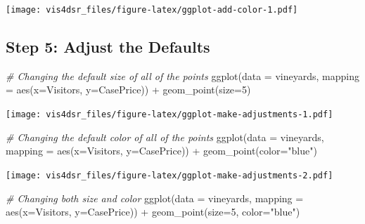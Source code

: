 \documentclass[
]{krantz}
\makeatletter
\newenvironment{Shaded}{\begin{snugshade}}{\end{snugshade}}
\newcommand{\AttributeTok}[1]{\textcolor[rgb]{0.61,0.61,0.61}{#1}}
\newcommand{\CommentTok}[1]{\textcolor[rgb]{0.37,0.37,0.37}{\textit{#1}}}
\newcommand{\DecValTok}[1]{\textcolor[rgb]{0.06,0.06,0.06}{#1}}
\newcommand{\FunctionTok}[1]{\textcolor[rgb]{0,0,0}{#1}}
\newcommand{\NormalTok}[1]{#1}
\newcommand{\SpecialCharTok}[1]{\textcolor[rgb]{0,0,0}{#1}}
\newcommand{\StringTok}[1]{\textcolor[rgb]{0.5,0.5,0.5}{#1}}
\newenvironment{kframe}{%
\medskip{}
\setlength{\fboxsep}{.8em}
 \def\at@end@of@kframe{}%
 \ifinner\ifhmode%
  \def\at@end@of@kframe{\end{minipage}}%
  \begin{minipage}{\columnwidth}%
 \fi\fi%
 \def\FrameCommand##1{\hskip\@totalleftmargin \hskip-\fboxsep
 \colorbox{shadecolor}{##1}\hskip-\fboxsep
     \hskip-\linewidth \hskip-\@totalleftmargin \hskip\columnwidth}%
 \MakeFramed {\advance\hsize-\width
   \@totalleftmargin\z@ \linewidth\hsize
   \@setminipage}}%
 {\par\unskip\endMakeFramed%
 \at@end@of@kframe}
\renewenvironment{Shaded}{\begin{kframe}}{\end{kframe}}
\makeatother
\begin{document}
\texttt{[image: vis4dsr\_files/figure-latex/ggplot-add-color-1.pdf]}

\hypertarget{step-5-adjust-the-defaults}{%
\subsection{Step 5: Adjust the Defaults}\label{step-5-adjust-the-defaults}}

\begin{Shaded}
\begin{Highlighting}[]
\CommentTok{\# Changing the default size of all of the points}
\FunctionTok{ggplot}\NormalTok{(}\AttributeTok{data =}\NormalTok{ vineyards, }\AttributeTok{mapping =} \FunctionTok{aes}\NormalTok{(}\AttributeTok{x=}\NormalTok{Visitors, }\AttributeTok{y=}\NormalTok{CasePrice)) }\SpecialCharTok{+}
  \FunctionTok{geom\_point}\NormalTok{(}\AttributeTok{size=}\DecValTok{5}\NormalTok{)}
\end{Highlighting}
\end{Shaded}

\texttt{[image: vis4dsr\_files/figure-latex/ggplot-make-adjustments-1.pdf]}

\begin{Shaded}
\begin{Highlighting}[]
\CommentTok{\# Changing the default color of all of the points}
\FunctionTok{ggplot}\NormalTok{(}\AttributeTok{data =}\NormalTok{ vineyards, }\AttributeTok{mapping =} \FunctionTok{aes}\NormalTok{(}\AttributeTok{x=}\NormalTok{Visitors, }\AttributeTok{y=}\NormalTok{CasePrice)) }\SpecialCharTok{+}
  \FunctionTok{geom\_point}\NormalTok{(}\AttributeTok{color=}\StringTok{"blue"}\NormalTok{)}
\end{Highlighting}
\end{Shaded}

\texttt{[image: vis4dsr\_files/figure-latex/ggplot-make-adjustments-2.pdf]}

\begin{Shaded}
\begin{Highlighting}[]
\CommentTok{\# Changing both size and color}
\FunctionTok{ggplot}\NormalTok{(}\AttributeTok{data =}\NormalTok{ vineyards, }\AttributeTok{mapping =} \FunctionTok{aes}\NormalTok{(}\AttributeTok{x=}\NormalTok{Visitors, }\AttributeTok{y=}\NormalTok{CasePrice)) }\SpecialCharTok{+}
  \FunctionTok{geom\_point}\NormalTok{(}\AttributeTok{size=}\DecValTok{5}\NormalTok{, }\AttributeTok{color=}\StringTok{"blue"}\NormalTok{)}
\end{Highlighting}
\end{Shaded}
\end{document}
